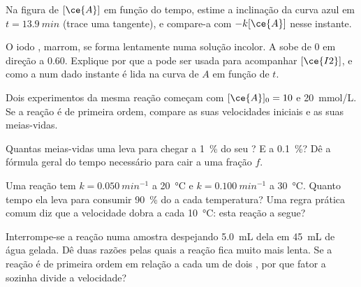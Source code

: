 \begin{exercise}[$\star\star$]\label{exo:g12:reaction-rates:9}
Na figura de $[\ce{A}]$ em função do tempo, estime a inclinação da curva
azul em $t = \qty{13.9}{min}$ (trace uma tangente), e compare-a com
$-k[\ce{A}]$ nesse instante.
\end{exercise}

\begin{exercise}[$\star\star$]\label{exo:g12:reaction-rates:10}
O iodo , marrom, se forma lentamente numa solução incolor. A
 sobe de 0 em direção a 0.60. Explique por que a 
pode ser usada para acompanhar $[\ce{I2}]$, e como a  num dado instante é lida na curva de $A$ em função de $t$.
\end{exercise}

\begin{exercise}[$\star\star$]\label{exo:g12:reaction-rates:11}
Dois experimentos da mesma reação começam com $[\ce{A}]_0 = 10$ e
\qty{20}{mmol/L}. Se a reação é de primeira ordem, compare as suas
velocidades iniciais e as suas meias-vidas.
\end{exercise}

\begin{exercise}[$\star\star\star$]\label{exo:g12:reaction-rates:12}
Quantas meias-vidas uma  leva para chegar a
\qty{1}{\percent} do seu ? E a \qty{0.1}{\percent}? Dê a fórmula
geral do tempo necessário para cair a uma fração $f$.
\end{exercise}

\begin{exercise}[$\star\star\star$]\label{exo:g12:reaction-rates:13}
Uma reação tem $k = \qty{0.050}{min^{-1}}$ a \qty{20}{\celsius} e
$k = \qty{0.100}{min^{-1}}$ a \qty{30}{\celsius}. Quanto tempo ela leva
para consumir \qty{90}{\percent} do  a cada temperatura? Uma
regra prática comum diz que a velocidade dobra a cada
\qty{10}{\celsius}: esta reação a segue?
\end{exercise}

\begin{exercise}[$\star\star\star$]\label{exo:g12:reaction-rates:14}
Interrompe-se a reação numa amostra despejando \qty{5.0}{mL} dela em
\qty{45}{mL} de água gelada. Dê duas razões pelas quais a reação fica
muito mais lenta. Se a reação é de primeira ordem em relação a cada um
de dois , por que fator a  sozinha divide a velocidade?
\end{exercise}

